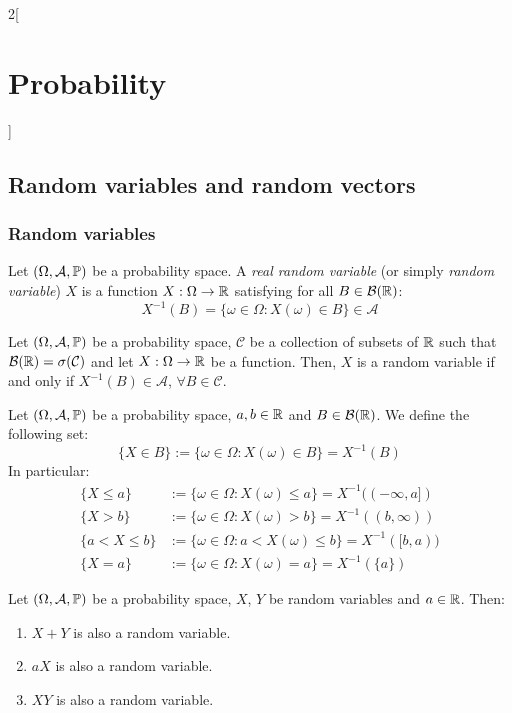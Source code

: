 \documentclass[../../../main.tex]{subfiles}
\begin{document}
\begin{multicols}{2}[\section{Probability}]
  \subsection{Random variables and random vectors}
  \subsubsection{Random variables}
  \begin{definition}
    Let $(\Omega,\mathcal{A},\mathbb{P})$ be a probability space. A \emph{real random variable} (or simply \emph{random variable}) $X$ is a function $X:\Omega\rightarrow\mathbb{R}$ satisfying for all $B\in\mathcal{B}(\mathbb{R})$: $$X^{-1}(B)=\{\omega\in\Omega:X(\omega)\in B\}\in\mathcal{A}$$
  \end{definition}
  \begin{proposition}
    Let $(\Omega,\mathcal{A},\mathbb{P})$ be a probability space, $\mathcal{C}$ be a collection of subsets of $\mathbb{R}$ such that $\mathcal{B}(\mathbb{R})=\sigma(\mathcal{C})$ and let $X:\Omega\rightarrow\mathbb{R}$ be a function. Then, $X$ is a random variable if and only if $X^{-1}(B)\in\mathcal{A}$, $\forall B\in \mathcal{C}$.
  \end{proposition}
  \begin{definition}
    Let $(\Omega,\mathcal{A},\mathbb{P})$ be a probability space, $a,b\in\mathbb{R}$ and $B\in\mathcal{B}(\mathbb{R})$. We define the following set:
    $$\{X\in B\}:=\{\omega\in\Omega:X(\omega)\in B\}=X^{-1}(B)$$
    In particular:
    \begin{align*}
      \{X\leq a\}   & :=\{\omega\in\Omega:X(\omega)\leq a\}=X^{-1}((-\infty,a]) \\
      \{X> b\}      & :=\{\omega\in\Omega:X(\omega)>b\}=X^{-1}((b,\infty))      \\
      \{a<X\leq b\} & :=\{\omega\in\Omega:a< X(\omega)\leq b\}=X^{-1}([b,a))    \\
      \{X=a\}       & :=\{\omega\in\Omega:X(\omega)=a\}=X^{-1}(\{a\})
    \end{align*}
  \end{definition}
  \begin{proposition}
    Let $(\Omega,\mathcal{A},\mathbb{P})$ be a probability space, $X$, $Y$ be random variables and $a\in\mathbb{R}$. Then:
    \begin{enumerate}
      \item $X+Y$ is also a random variable.
      \item $aX$ is also a random variable.
      \item $XY$ is also a random variable.

\end{enumerate}
\end{proposition}
\end{multicols}
\end{document}
